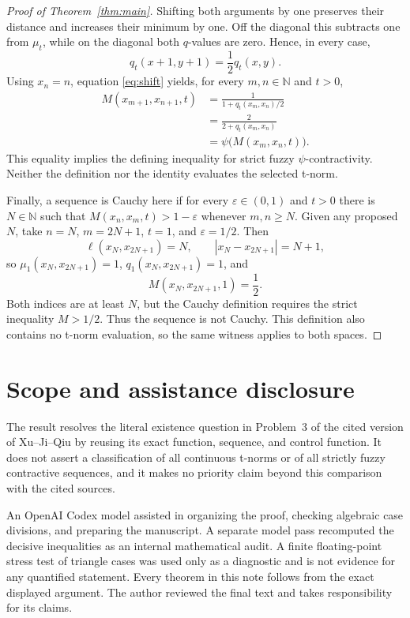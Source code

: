 \documentclass[11pt]{article}
\begin{document}
\begin{proof}[Proof of Theorem~\ref{thm:main}]
Shifting both arguments by one preserves their distance and increases their
minimum by one.  Off the diagonal this subtracts one from $\mu_t$, while on
the diagonal both $q$-values are zero.  Hence, in every case,
\begin{equation}\label{eq:shift}
 q_t(x+1,y+1)=\frac12q_t(x,y).
\end{equation}
Using $x_n=n$, equation \eqref{eq:shift} yields, for every
$m,n\in\mathbb N$ and $t>0$,
\begin{align*}
 M(x_{m+1},x_{n+1},t)
 &=\frac{1}{1+q_t(x_m,x_n)/2}\\
 &=\frac{2}{2+q_t(x_m,x_n)}\\
 &=\psi\bigl(M(x_m,x_n,t)\bigr).
\end{align*}
This equality implies the defining inequality for strict fuzzy
$\psi$-contractivity.  Neither the definition nor the identity evaluates
the selected t-norm.

Finally, a sequence is Cauchy here if for every $\varepsilon\in(0,1)$ and
$t>0$ there is $N\in\mathbb N$ such that
$M(x_n,x_m,t)>1-\varepsilon$ whenever $m,n\ge N$.  Given any proposed $N$,
take $n=N$, $m=2N+1$, $t=1$, and $\varepsilon=1/2$.  Then
\[
 \ell(x_N,x_{2N+1})=N,\qquad |x_N-x_{2N+1}|=N+1,
\]
so $\mu_1(x_N,x_{2N+1})=1$, $q_1(x_N,x_{2N+1})=1$, and
\[
 M(x_N,x_{2N+1},1)=\frac12.
\]
Both indices are at least $N$, but the Cauchy definition requires the strict
inequality $M>1/2$.  Thus the sequence is not Cauchy.  This definition also
contains no t-norm evaluation, so the same witness applies to both spaces.
\end{proof}

\section{Scope and assistance disclosure}

The result resolves the literal existence question in Problem~3 of the cited
version of Xu--Ji--Qiu by reusing its exact function, sequence, and control
function.  It does not assert a classification of all continuous t-norms or
of all strictly fuzzy contractive sequences, and it makes no priority claim
beyond this comparison with the cited sources.

An OpenAI Codex model assisted in organizing the proof, checking algebraic
case divisions, and preparing the manuscript.  A separate model pass
recomputed the decisive inequalities as an internal mathematical audit.  A
finite floating-point stress test of triangle cases was used only as a
diagnostic and is not evidence for any quantified statement.  Every theorem
in this note follows from the exact displayed argument.  The author reviewed
the final text and takes responsibility for its claims.



\end{document}
